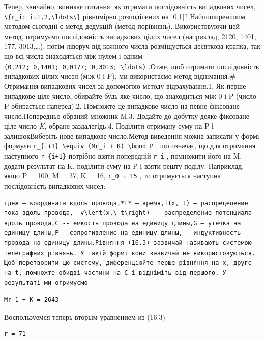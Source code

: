 \documentclass[
  ukrainian,
]{article}
\begin{document}
Тепер, звичайно, виникає питання: як отримати послідовність випадкових
чисел,
\texttt{\textbackslash{}\{r\_i:\ i=1,2,\textbackslash{}ldots\textbackslash{}\}}
рівномірно розподілених на {[}0,1{]}? Найпоширенішим методом сьогодні є
метод дедукцій (метод порівнянь). Використовуючи цей метод, отримуємо
послідовність випадкових цілих чисел (наприклад, 2120, 1401, 177,
3013,\ldots), потім ліворуч від кожного числа розміщується десяткова
крапка, так що всі числа знаходяться між нулем і одним
\texttt{(0,212;\ 0,1401;\ 0,0177;\ 0,3013;\ \textbackslash{}ldots)}
.Отже, щоб отримати послідовність випадкових цілих чисел (між 0 і P), ми
використаємо метод віднімання.\# Отримання випадкових чисел за допомогою
методу відрахування.1. Як перше випадкове ціле число, обирайте будь-яке
число, що знаходиться між 0 і P (число P обирається наперед).2. Помножте
це випадкове число на певне фіксоване число.Попередньо обраний множник
M.3. Додайте до добутку деяке фіксоване ціле число \emph{K}, обране
заздалегідь.4. Поділити отриману суму на P і залишокВиберіть нове
випадкове число.Метод виведення можна записати у формі формули
\texttt{r\_\{i+1\}\ \textbackslash{}equiv\ (Mr\_i\ +\ K)\ \textbackslash{}bmod\ P}
, що означає, що для отримання наступного \texttt{r\_\{i+1\}} потрібно
взяти попередній \texttt{r\_i} , помножити його на M, додати результат
на K, поділити суму на P і взяти решту поділу. Наприклад, якщо P = 100,
M = 37, K = 16, \texttt{r\_0\ =\ 15} , то отримується наступна
послідовність випадкових чисел:

\begin{verbatim}
гдеж — координата вдоль провода,*t* — время,i(x, t) — распределение тока вдоль провода,  v\left(x,\ t\right)  — распределение потенциала вдоль провода,С -- емкость провода на единицу длины,G — утечка на единицу длины,Р — сопротивление на единицу длины,-- индуктивность провода на единицу длины.Рівняння (16.3) зазвичай називають системою телеграфних рівнянь. У такій формі вони зазвичай не використовуються. Щоб перетворити цю систему, диференціюйте перше рівняння на x, друге на t, помножте обидві частини на C і відніміть від першого. У результаті ми отримуємо
\end{verbatim}

\begin{verbatim}
Mr_1 + K = 2643
\end{verbatim}

Воспользуемся теперь вторым уравнением из (16.3)

\begin{verbatim}
r = 71
\end{verbatim}
\end{document}
